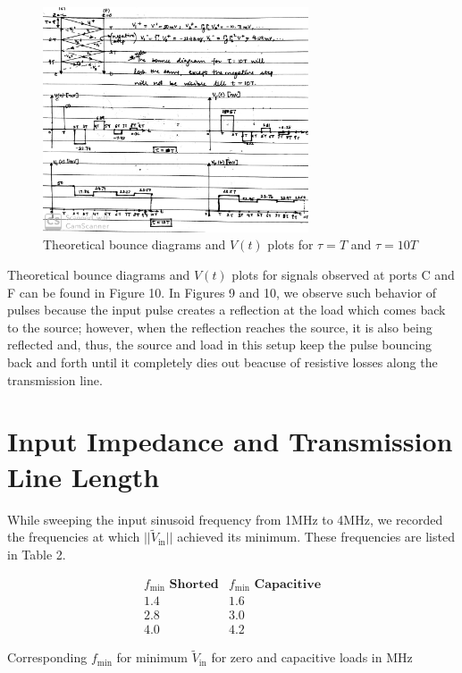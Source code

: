 \documentclass[10pt]{article}
\begin{document}
\begin{figure}[ht]
    \centering
    \includegraphics[width=0.7\textwidth]{../photos/lab1/v_t_bounce_mult_ref.jpg}
    \caption{Theoretical bounce diagrams and $V(t)$ plots for $\tau = T$ and $\tau = 10T$\vspace{-0.5cm}}
    \label{v_t_bounce_mult}
\end{figure}

Theoretical bounce diagrams and $V(t)$ plots for signals observed at ports C and F can be found in Figure 10. In Figures 9 and 10, 
we observe such behavior of pulses because the input pulse creates a reflection at the load which comes back to the source; however,
when the reflection reaches the source, it is also being reflected and, thus, the source and load in this setup 
keep the pulse bouncing back and forth until it completely dies out beacuse of resistive losses along the transmission line.


\section{Input Impedance and Transmission Line Length}

While sweeping the input sinusoid frequency from 1MHz to 4MHz, we recorded the frequencies at 
which $||\tilde V_\text{in}||$ achieved its minimum. These frequencies are listed in Table 2.
\begin{table}[ht]
    \[
        \begin{array}{c|c}
            f_\text{min} \textbf{ Shorted} &  f_\text{min} \textbf{ Capacitive} \\ \hline
            1.4 & 1.6\\
            2.8 & 3.0\\
            4.0 & 4.2
        \end{array}
    \]
    \caption{Corresponding $f_\text{min}$ for minimum $\tilde V_\text{in}$ for zero and capacitive loads in $\text{MHz}$\vspace{-0.5cm}}
\end{table}
\end{document}
